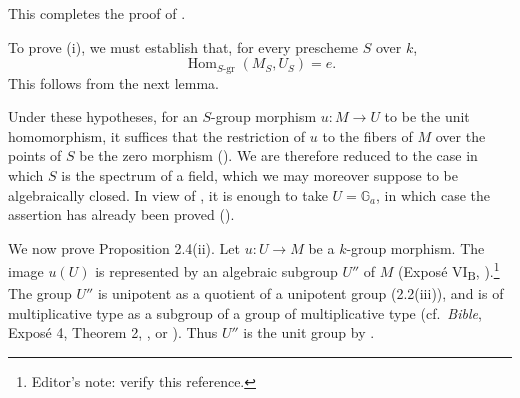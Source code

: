 This completes the proof of .


To prove (i), we must establish that, for every prescheme \(S\) over
\(k\),
\[
  \operatorname{Hom}_{S\text{-gr}}(M_S,U_S)=e.
\]
This follows from the next lemma.


Under these hypotheses, for an \(S\)-group morphism \(u:M\to U\) to
be the unit homomorphism, it suffices that the restriction of \(u\) to
the fibers of \(M\) over the points of \(S\) be the zero morphism
().  We are therefore reduced to the case in which \(S\)
is the spectrum of a field, which we may moreover suppose to be
algebraically closed.  In view of , it is enough to take
\(U=\mathbb G_a\), in which case the assertion has already been proved
().

We now prove Proposition 2.4(ii).  Let \(u:U\to M\) be a \(k\)-group
morphism.  The image \(u(U)\) is represented by an algebraic subgroup
\(U''\) of \(M\) (Exposé VI\textsubscript{B}, ).\footnote{Editor's
note: verify this reference.}  The group \(U''\) is unipotent as a
quotient of a unipotent group (2.2(iii)), and is of multiplicative type
as a subgroup of a group of multiplicative type (cf.\ \textit{Bible},
Exposé 4, Theorem 2, , or ).  Thus \(U''\) is
the unit group by .

